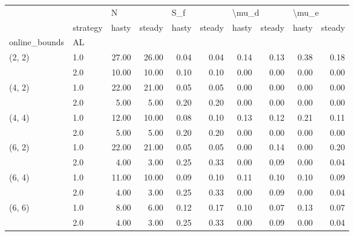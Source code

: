 \begin{tabular}{llrrrrrrrr}
\toprule
       & {} & \multicolumn{2}{l}{N} & \multicolumn{2}{l}{S\_f} & \multicolumn{2}{l}{\textbackslash mu\_d} & \multicolumn{2}{l}{\textbackslash mu\_e} \\
       & strategy & hasty & steady & hasty & steady & hasty & steady & hasty & steady \\
online\_bounds & AL &       &        &       &        &       &        &       &        \\
\midrule
(2, 2) & 1.0 & 27.00 &  26.00 &  0.04 &   0.04 &  0.14 &   0.13 &  0.38 &   0.18 \\
       & 2.0 & 10.00 &  10.00 &  0.10 &   0.10 &  0.00 &   0.00 &  0.00 &   0.00 \\
(4, 2) & 1.0 & 22.00 &  21.00 &  0.05 &   0.05 &  0.00 &   0.00 &  0.00 &   0.00 \\
       & 2.0 &  5.00 &   5.00 &  0.20 &   0.20 &  0.00 &   0.00 &  0.00 &   0.00 \\
(4, 4) & 1.0 & 12.00 &  10.00 &  0.08 &   0.10 &  0.13 &   0.12 &  0.21 &   0.11 \\
       & 2.0 &  5.00 &   5.00 &  0.20 &   0.20 &  0.00 &   0.00 &  0.00 &   0.00 \\
(6, 2) & 1.0 & 22.00 &  21.00 &  0.05 &   0.05 &  0.00 &   0.14 &  0.00 &   0.20 \\
       & 2.0 &  4.00 &   3.00 &  0.25 &   0.33 &  0.00 &   0.09 &  0.00 &   0.04 \\
(6, 4) & 1.0 & 11.00 &  10.00 &  0.09 &   0.10 &  0.11 &   0.10 &  0.10 &   0.09 \\
       & 2.0 &  4.00 &   3.00 &  0.25 &   0.33 &  0.00 &   0.09 &  0.00 &   0.04 \\
(6, 6) & 1.0 &  8.00 &   6.00 &  0.12 &   0.17 &  0.10 &   0.07 &  0.13 &   0.07 \\
       & 2.0 &  4.00 &   3.00 &  0.25 &   0.33 &  0.00 &   0.09 &  0.00 &   0.04 \\
\bottomrule
\end{tabular}
